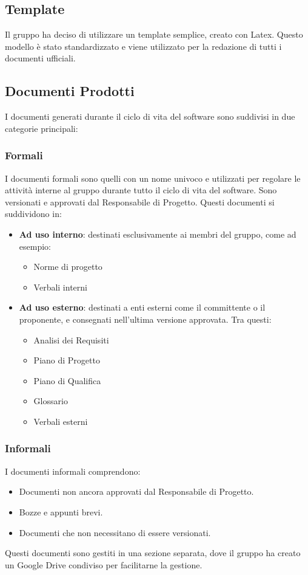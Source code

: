 \subsection{Template}

Il gruppo ha deciso di utilizzare un template semplice, creato con Latex. Questo modello è stato 
standardizzato e viene utilizzato per la redazione di tutti i documenti ufficiali.

\subsection{Documenti Prodotti}

I documenti generati durante il ciclo di vita del software sono suddivisi in due categorie principali:

\subsubsection{Formali}
I documenti formali sono quelli con un nome univoco e utilizzati per regolare le attività interne al gruppo 
durante tutto il ciclo di vita del software. 
Sono versionati e approvati dal Responsabile di Progetto. 
Questi documenti si suddividono in:
\begin{itemize}
    \item \textbf{Ad uso interno}: destinati esclusivamente ai membri del gruppo, come ad esempio:
    \begin{itemize}
        \item Norme di progetto
        \item Verbali interni
    \end{itemize}
    \item \textbf{Ad uso esterno}: destinati a enti esterni come il committente o il proponente, e consegnati 
    nell'ultima versione approvata. Tra questi:
    \begin{itemize}
        \item Analisi dei Requisiti
        \item Piano di Progetto
        \item Piano di Qualifica
        \item Glossario
        \item Verbali esterni
    \end{itemize}
\end{itemize}

\subsubsection{Informali}
I documenti informali comprendono:
\begin{itemize}
    \item Documenti non ancora approvati dal Responsabile di Progetto.
    \item Bozze e appunti brevi.
    \item Documenti che non necessitano di essere versionati.
\end{itemize}
Questi documenti sono gestiti in una sezione separata, dove il gruppo ha creato un Google Drive condiviso per facilitarne la gestione.

